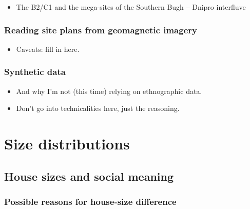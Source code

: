 \documentclass[
  12pt,
]{book}
\providecommand{\tightlist}{%
  \setlength{\itemsep}{0pt}\setlength{\parskip}{0pt}}
\begin{document}
\begin{itemize}
\tightlist
\item
  The B2/C1 and the mega-sites of the Southern Bugh -- Dnipro interfluve
\end{itemize}

\hypertarget{reading-site-plans-from-geomagnetic-imagery}{%
\section{Reading site plans from geomagnetic imagery}\label{reading-site-plans-from-geomagnetic-imagery}}

\begin{itemize}
\tightlist
\item
  Caveats: fill in here.
\end{itemize}

\hypertarget{synthetic-data}{%
\section{Synthetic data}\label{synthetic-data}}

\begin{itemize}
\item
  And why I'm not (this time) relying on ethnographic data.
\item
  Don't go into technicalities here, just the reasoning.
\end{itemize}

\hypertarget{part-size-distributions}{%
\part{Size distributions}\label{part-size-distributions}}

\hypertarget{house-sizes-theory}{%
\chapter{House sizes and social meaning}\label{house-sizes-theory}}

\hypertarget{possible-reasons-for-house-size-difference}{%
\section{Possible reasons for house-size difference}\label{possible-reasons-for-house-size-difference}}
\end{document}
